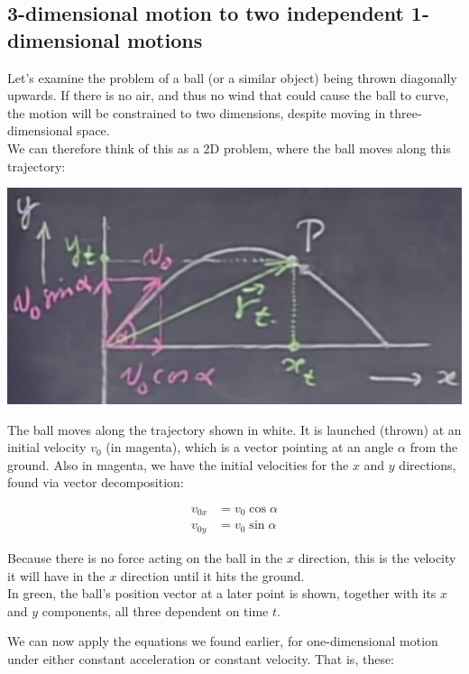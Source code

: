 \documentclass[12pt,a4paper]{report}
\begin{document}
\newpage

\subsection{3-dimensional motion to two independent 1-dimensional motions}

Let's examine the problem of a ball (or a similar object) being thrown diagonally upwards. If there is no air, and thus no wind that could cause the ball to curve, the motion will be constrained to two dimensions, despite moving in three-dimensional space.\\
We can therefore think of this as a 2D problem, where the ball moves along this trajectory:

\begin{center}
\includegraphics[scale=0.65]{Graphics/2d-motion-decomposed}
\end{center}

The ball moves along the trajectory shown in white. It is launched (thrown) at an initial velocity $v_0$ (in magenta), which is a vector pointing at an angle $\alpha$ from the ground. Also in magenta, we have the initial velocities for the $x$ and $y$ directions, found via vector decomposition:

\begin{align}
v_{0x} &= v_0 \cos \alpha\\
v_{0y} &= v_0 \sin \alpha
\end{align}

Because there is no force acting on the ball in the $x$ direction, this is the velocity it will have in the $x$ direction until it hits the ground.\\
In green, the ball's position vector at a later point is shown, together with its $x$ and $y$ components, all three dependent on time $t$.

We can now apply the equations we found earlier, for one-dimensional motion under either constant acceleration or constant velocity. That is, these:
\end{document}
